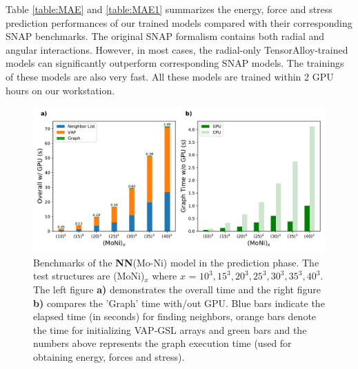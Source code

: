 \documentclass[final,1p,times]{elsarticle}
\begin{document}
Table \ref{table:MAE} and \ref{table:MAE1} summarizes the energy, force and 
stress prediction performances of our trained models compared with their 
corresponding SNAP benchmarks. 
The original SNAP formalism contains both radial and angular 
interactions. However, in most cases, the radial-only TensorAlloy-trained 
models can significantly outperform corresponding SNAP models. The trainings of 
these models are also very fast. All these models are trained within 2 GPU hours
on our workstation. 

% 
%
\begin{figure}[h!]
    \centering
    \includegraphics[scale=0.5]{figures/Prediction-speed.pdf}
\caption{\label{fig:prediction_speed} Benchmarks of the \textbf{NN}(Mo-Ni) model 
in the prediction phase. The test structures are (MoNi)$_{x}$ where 
$x$ = $10^3, 15^3, 20^3, 25^3, 30^3, 35^3, 40^3$. The left figure \textbf{a)} 
demonstrates the overall time and the right figure \textbf{b)} compares the 
'Graph' time with/out GPU. Blue bars indicate the elapsed time (in seconds) for 
finding neighbors, orange bars denote the time for initializing VAP-GSL arrays 
and green bars and the numbers above represents the graph execution time (used 
for obtaining energy, forces and stress).
}
\end{figure}
\end{document}
